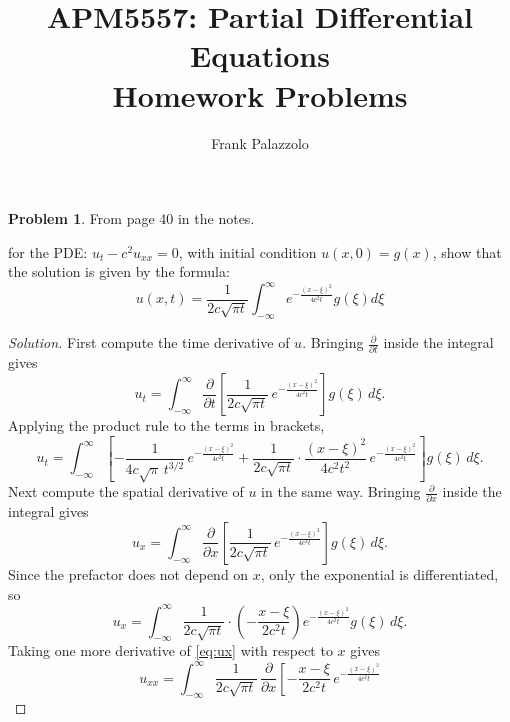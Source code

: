 \documentclass[11pt]{article}
\title{APM5557: Partial Differential Equations\\Homework Problems}
\author{Frank Palazzolo}
\date{}
\newcommand{\pd}[2]{\frac{\partial #1}{\partial #2}}
\theoremstyle{definition}
\newtheorem{problem}{Problem}
\begin{document}
\maketitle

\begin{problem}
From page 40 in the notes.

for the PDE: 
$u_t - c^2 u_{xx} = 0$, 
with initial condition $u(x,0) = g(x)$, 
show that the solution is given by the formula:
\begin{equation} \label{eq:solution}
u(x,t) = \frac{1}{2c\sqrt{\pi t}} \int_{-\infty}^{\infty} e^{-\frac{(x-\xi)^2}{4c^2t}} g(\xi) d\xi
\end{equation}
\end{problem}

\begin{proof}[Solution]
First compute the time derivative of $u$. Bringing $\pd{}{t}$ inside the
integral gives
\begin{equation} \label{eq:ut-inside}
u_t = \int_{-\infty}^{\infty} \pd{}{t}\left[
  \frac{1}{2c\sqrt{\pi t}} \, e^{-\frac{(x-\xi)^2}{4c^2t}}
\right] g(\xi) \, d\xi.
\end{equation}
Applying the product rule to the terms in brackets,
\begin{equation} \label{eq:ut}
u_t = \int_{-\infty}^{\infty} \left[
  -\frac{1}{4c\sqrt{\pi}\, t^{3/2}} \, e^{-\frac{(x-\xi)^2}{4c^2t}}
  + \frac{1}{2c\sqrt{\pi t}} \cdot \frac{(x-\xi)^2}{4c^2t^2} \,
    e^{-\frac{(x-\xi)^2}{4c^2t}}
\right] g(\xi) \, d\xi.
\end{equation}
Next compute the spatial derivative of $u$ in the same way. Bringing
$\pd{}{x}$ inside the integral gives
\begin{equation} \label{eq:ux-inside}
u_x = \int_{-\infty}^{\infty} \pd{}{x}\left[
  \frac{1}{2c\sqrt{\pi t}} \, e^{-\frac{(x-\xi)^2}{4c^2t}}
\right] g(\xi) \, d\xi.
\end{equation}
Since the prefactor does not depend on $x$, only the exponential is
differentiated, so
\begin{equation} \label{eq:ux}
u_x = \int_{-\infty}^{\infty}
  \frac{1}{2c\sqrt{\pi t}} \cdot \left(-\frac{x-\xi}{2c^2t}\right)
  e^{-\frac{(x-\xi)^2}{4c^2t}} g(\xi) \, d\xi.
\end{equation}
Taking one more derivative of \eqref{eq:ux} with respect to $x$ gives
\begin{equation} \label{eq:uxx-inside}
u_{xx} = \int_{-\infty}^{\infty}
  \frac{1}{2c\sqrt{\pi t}} \, \pd{}{x}\left[
    -\frac{x-\xi}{2c^2t} \, e^{-\frac{(x-\xi)^2}{4c^2t}}

\end{equation}
\end{proof}
\end{document}
